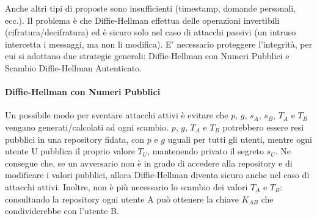 Anche altri tipi di proposte sono insufficienti (timestamp, domande personali, ecc.). Il problema è che Diffie-Hellman effettua delle operazioni invertibili (cifratura/decifratura) ed è sicuro solo nel caso di attacchi passivi (un intruso intercetta i messaggi, ma non li modifica). E' necessario proteggere l'integrità, per cui si adottano due strategie generali: Diffie-Hellman con Numeri Pubblici e Scambio Diffie-Hellman Autenticato.	


\paragraph{Diffie-Hellman con Numeri Pubblici} Un possibile modo per sventare attacchi attivi è evitare che $p$, $g$, $s_{A}$, $s_{B}$, $T_{A}$ e $T_{B}$ vengano generati/calcolati ad ogni scambio. $p$, $g$, $T_{A}$ e $T_{B}$ potrebbero essere resi pubblici in una repository fidata, con $p$ e $g$ uguali per tutti gli utenti, mentre ogni utente U pubblica il proprio valore $T_{U}$, mantenendo privato il segreto $s_{U}$. Ne consegue che, se un avversario non è in grado di accedere alla repository e di modificare i valori pubblici, allora Diffie-Hellman diventa sicuro anche nel caso di attacchi attivi. Inoltre, non è più necessario lo scambio dei valori $T_{A}$ e $T_{B}$: consultando la repository ogni utente A può ottenere la chiave $K_{AB}$ che condividerebbe con l'utente B. 

